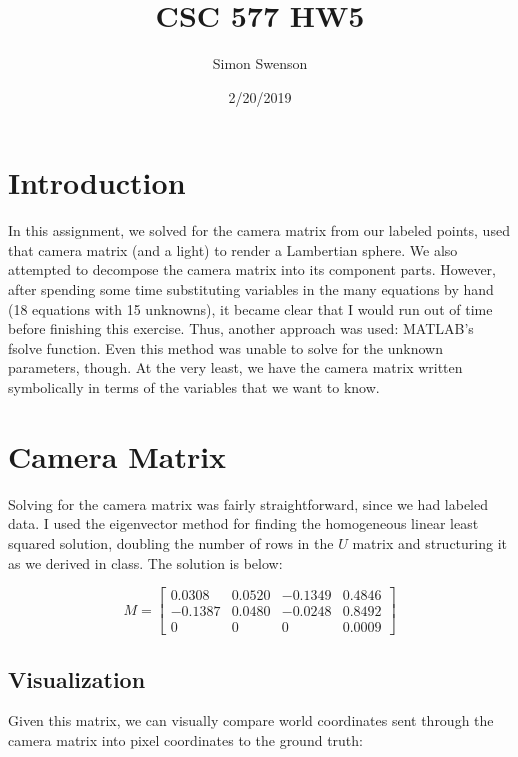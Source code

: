 \documentclass{article}
\title{CSC 577 HW5}
\date{2/20/2019}
\author{Simon Swenson}
\begin{document}
\maketitle
{}

\section{Introduction}

In this assignment, we solved for the camera matrix from our labeled points, 
used that camera matrix (and a light) to render a Lambertian sphere. We also 
attempted to decompose the camera matrix into its component parts. However, 
after spending some time substituting variables in the many equations by hand 
(18 equations with 15 unknowns), it became clear that I would run out of time 
before finishing this exercise. Thus, another approach was used: MATLAB's fsolve 
function. Even this method was unable to solve for the unknown parameters, 
though. At the very least, we have the camera matrix written symbolically in 
terms of the variables that we want to know.

\section{Camera Matrix}

Solving for the camera matrix was fairly straightforward, since we had labeled 
data. I used the eigenvector 
method for finding the homogeneous linear least squared solution, doubling the 
number of rows in the $U$ matrix and structuring it as we derived in class. The 
solution is below:

$$
M = \begin{bmatrix}
 0.0308 & 0.0520 & -0.1349 & 0.4846 \\
-0.1387 & 0.0480 & -0.0248 & 0.8492 \\
 0      & 0      &  0      & 0.0009
\end{bmatrix}
$$

\subsection{Visualization}

Given this matrix, we can visually compare world coordinates sent through the 
camera matrix into pixel coordinates to the ground truth:
\end{document}
